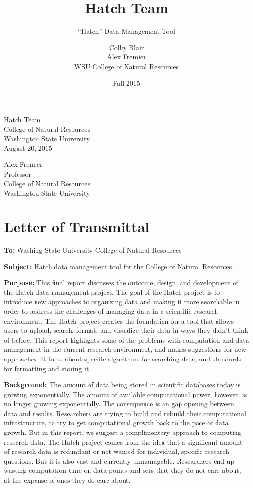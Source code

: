\documentclass[12pt,letterpaper]{scrartcl}
\date{Fall 2015}
\title{Hatch Team\\
}
\subtitle{``Hatch'' Data Management Tool}
\author{Colby Blair \\
	Alex Fremier \\
	WSU College of Natural Resources \\
}
\begin{document}
\begin{flushright}
    Hatch Team \\
    College of Natural Resources \\
    Washington State University \\
    August 20, 2015 \\
\end{flushright}

\noindent
Alex Fremier \\
Professor \\
College of Natural Resources \\
Washington State University 

\section*{Letter of Transmittal}

\textbf{To:} Washing State University College of Natural Resources

\noindent
\textbf{Subject:} Hatch data management tool for the College of Natural Resources.

\textbf{Purpose:} This final report discusses the outcome, design, and development of the Hatch data management project.
The goal of the Hatch project is to introduce new approaches to organizing data and making
it more searchable in order to address the challenges of managing data in a scientific research
environment.
The Hatch project creates the foundation for a tool that allows users to upload, search,
format, and visualize their data in ways they didn't think of before. This report highlights some of the 
problems with computation and data management in the current research environment, and makes 
suggestions for new approaches. It talks about specific algorithms for searching data, and standards for
formatting and storing it.

\textbf{Background:} The amount of data being stored in scientific databases today is growing 
exponentially. The amount of available computational power, however, is no longer growing 
exponentially.
The consequence is an gap opening between data and results. Researchers are trying to build and rebuild
their computational infrastructure, to try to get computational growth back to the pace of data growth.
But in this report, we suggest a complimentary approach to computing research data. The Hatch project
comes from the idea that a significant amount of research data is redundant or not wanted for individual, specific
 research questions.
But it is also vast and currently unmanagable. Researchers end up wasting computation time on data points and sets
that they do not care about, at the expense of ones they do care about.
\end{document}
